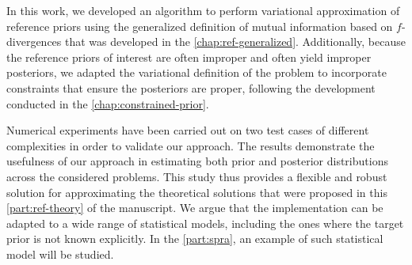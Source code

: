 In this work, we developed an algorithm to perform variational approximation of reference priors using the generalized definition of mutual information based on $f$-divergences that was developed in the \cref{chap:ref-generalized}.
Additionally, because the reference priors of interest are often improper and often yield improper posteriors, we adapted the variational definition of the problem to incorporate constraints that ensure the posteriors are proper, following the development conducted in the \cref{chap:constrained-prior}. 


Numerical experiments have been carried out on two test cases of different complexities in order to validate our approach.
The results demonstrate the usefulness of our approach in estimating both prior and posterior distributions across the considered problems. %
This study thus provides a flexible and robust solution for approximating the theoretical solutions that were proposed in this \cref{part:ref-theory} of the manuscript.
We argue that the implementation can be adapted to a wide range of statistical models, including the ones where the target prior is not known explicitly.
In the \cref{part:spra}, an example of such statistical model will be studied.













